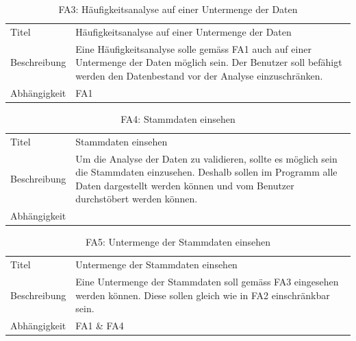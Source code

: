 \begin{table}[H] 
	\caption{FA3: Häufigkeitsanalyse auf einer Untermenge der Daten}
	\centering
	\label{fig:anforderungsanalyse:funktionaleanforderung:fa3}
	\begin{tabular}{ | l | L{10cm} | } 
		\hline 
		 \\ \hline 
		Titel & Häufigkeitsanalyse auf einer Untermenge der Daten \\ \hline 
		Beschreibung & Eine Häufigkeitsanalyse solle gemäss FA1 auch auf einer Untermenge der Daten möglich sein. Der Benutzer soll befähigt werden den Datenbestand vor der Analyse einzuschränken. \\ \hline 
		Abhängigkeit & FA1 \\ \hline 
	\end{tabular}
\end{table}

\begin{table}[H] 
	\caption{FA4: Stammdaten einsehen}
	\centering
	\label{fig:anforderungsanalyse:funktionaleanforderung:fa4}
	\begin{tabular}{ | l | L{10cm} | } 
		\hline 
		 \\ \hline 
		Titel & Stammdaten einsehen \\ \hline 
		Beschreibung & Um die Analyse der Daten zu validieren, sollte es möglich sein die Stammdaten einzusehen. Deshalb sollen im Programm alle Daten dargestellt werden können und vom Benutzer durchstöbert werden können. \\ \hline 
		Abhängigkeit & \\ \hline 
	\end{tabular}
\end{table}

\begin{table}[H] 
	\caption{FA5: Untermenge der Stammdaten einsehen}
	\centering
	\label{fig:anforderungsanalyse:funktionaleanforderung:fa5}
	\begin{tabular}{ | l | L{10cm} | } 
		\hline 
		 \\ \hline 
		Titel & Untermenge der Stammdaten einsehen \\ \hline 
		Beschreibung & Eine Untermenge der Stammdaten soll gemäss FA3 eingesehen werden können. Diese sollen gleich wie in FA2 einschränkbar sein. \\ \hline 
		Abhängigkeit & FA1 \& FA4 \\ \hline 
	\end{tabular}
\end{table}

